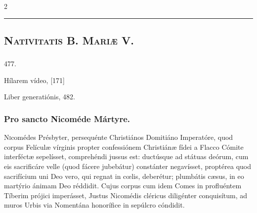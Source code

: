 \documentclass[9pt,twoside]{extarticle}
\begin{document}
\begin{multicols}{2}
\begin{center}\textcolor{red}{\rule{\linewidth}{0.5pt}} \end{center}

\subsection*{\center {}}
\subsubsection*{\center {}}
\subsection*{\center \textsc{Nativitatis B. Mariæ V.}}
\subsubsection*{\center {}}

\begin{tightlist}{}
\item {} 477. 
\item {}
\item {} Hílarem vídeo,  [171]
\item {} Liber generatiónis,  482.
\item {}
\end{tightlist}

\subsubsection*{\center Pro sancto Nicoméde Mártyre.}
\begin{center}\end{center}
\lettrine{N}icomédes Présbyter, persequénte Christiános Domitiáno Imperatóre, quod corpus Felículæ vírginis propter confessiónem Christiánæ fídei a Flacco Cómite interféctæ sepelísset, comprehéndi jussus est: ductúsque ad státuas deórum, cum eis sacrificáre velle (quod fácere jubebátur) constánter negavísset, proptérea quod sacrifícium uni Deo vero, qui regnat in cœlis, deberétur; plumbátis cæsus, in eo martýrio ánimam Deo réddidit. Cujus corpus cum idem Comes in profluéntem Tíberim prójici imperásset, Justus Nicomédis cléricus diligénter conquisítum, ad muros Urbis via Nomentána honorífice in sepúlcro cóndidit.


\end{multicols}
\end{document}
